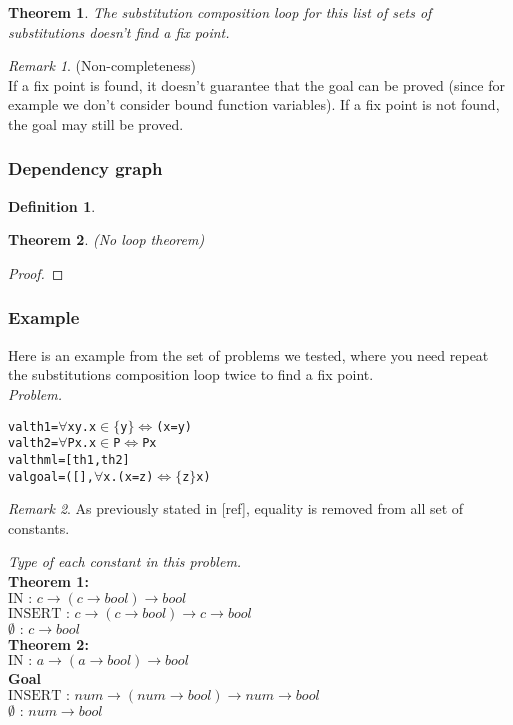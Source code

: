 \documentclass[a4paper, 11pt]{article}
\theoremstyle{plain}
\newtheorem*{thm}{Theorem}
\theoremstyle{definition}
\newtheorem*{mydef}{Definition}
\theoremstyle{remark}
\newtheorem*{remark}{Remark}
\begin{document}
\begin{thm}
The substitution composition loop for this list of sets of substitutions doesn't find a fix point.
\end{thm}  

\begin{remark} (Non-completeness)
\\If a fix point is found, it doesn't guarantee that the goal can be proved (since for example we don't consider bound function variables). If a fix point is not found, the goal may still be proved.
\end{remark}

\subsubsection{Dependency graph}
\begin{mydef}
\end{mydef}

\begin{thm} (No loop theorem)
\end{thm}

\begin{proof}
\end{proof}

\subsubsection{Example}
Here is an example from the set of problems we tested, where you need repeat the substitutions composition loop twice to find a fix point.
\vspace{5mm} \\
\textit{Problem.}
\begin{alltt}
val th1 = \(\forall\) x y. x \(\in \lbrace\) y \(\rbrace \iff\) (x = y)
val th2 = \(\forall\) P x. x \(\in\) P \(\iff\) P x
val thml = [th1,th2]
val goal = ([], \(\forall\) x. (x = z) \(\iff \lbrace\) z \(\rbrace\) x)
\end{alltt}

\begin{remark} As previously stated in [ref], equality is removed from all set of constants.
\end{remark}

\vspace{5mm}
\noindent \textit{Type of each constant in this problem.}
\\  \textbf{Theorem 1:} \\
  $\mbox{IN : }c \rightarrow (c \rightarrow bool) \rightarrow 
bool$ \\
  $ \mbox{INSERT : }c \rightarrow (c \rightarrow bool) \rightarrow c \rightarrow bool$ \\
  $ \emptyset \mbox{ : }c \rightarrow bool$\\ 
  \textbf{Theorem 2:} \\
  $\mbox{IN : }a \rightarrow (a \rightarrow bool) \rightarrow bool$\\
  \textbf{Goal}\\  
  $\mbox{INSERT : } num \rightarrow (num \rightarrow bool)   \rightarrow num \rightarrow bool$ \\
  $\emptyset\mbox{ : } num \rightarrow bool$\\
\end{document}
